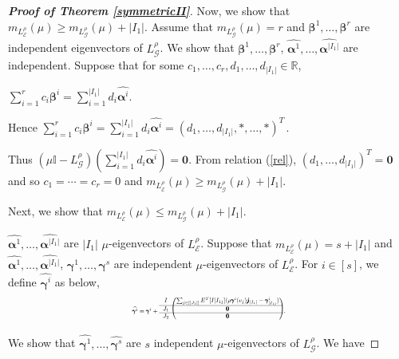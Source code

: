 \documentclass{amsart}
\theoremstyle{remark}
\begin{document}
\begin{proof}[\textbf{Proof of Theorem \ref{symmetricII}}]
Now, we show that $m_{L_{\mathcal{E}}^{\rho}}(\mu)\geq m_{L_{\mathcal{G}}^{\rho}}(\mu)+|I_{1}|$.
Assume that $m_{L_{\mathcal{G}}^{\rho}}(\mu)=r$ and $\pmb{\beta}^{1},\ldots,\pmb{\beta}^{r}$ are independent eigenvectors of $L_{\mathcal{G}}^{\rho}$. We show that $\pmb{\beta}^{1},\ldots,\pmb{\beta}^{r}$, $\widehat{\pmb{\alpha}^{1}},\ldots,\widehat{\pmb{\alpha}^{|I_{1}|}}$ are independent. Suppose that for some $c_{1},\ldots,c_{r},d_{1},\ldots,d_{|I_{1}|}\in\mathbb{R}$,
\begin{center}
$\sum_{i=1}^{r}c_{i}\pmb{\beta}^{i}=\sum_{i=1}^{|I_{1}|}d_{i}\widehat{\pmb{\alpha}^{i}}.$
\end{center}
Hence $\sum_{i=1}^{r}c_{i}\pmb{\beta}^{i}=\sum_{i=1}^{|I_{1}|}d_{i}\widehat{\pmb{\alpha}^{i}}=(d_{1},\ldots,d_{|I_{1}|},\ast,\ldots,\ast)^{T}\,.$

Thus $(\mu\mathbb{I}-L_{\mathcal{G}}^{\rho})(\sum_{i=1}^{|I_{1}|}d_{i}\widehat{\pmb{\alpha}^{i}})=\pmb{0}$. From relation (\ref{rel}),
$(d_{1},\ldots,d_{|I_{1}|})^{T}=\pmb{0}$ and so $c_{1}=\cdots=c_{r}=0$ and $m_{L_{\mathcal{E}}^{\rho}}(\mu)\geq m_{L_{\mathcal{G}}^{\rho}}(\mu)+|I_{1}|$.

Next, we show that $m_{L_{\mathcal{E}}^{\rho}}(\mu)\leq m_{L_{\mathcal{G}}^{\rho}}(\mu)+|I_{1}|$.


 $\widehat{\pmb{\alpha}^{1}},\ldots,\widehat{\pmb{\alpha}^{|I_{1}|}}$ are $|I_{1}|$ $\mu$-eigenvectors of $L_{\mathcal{E}}^{\rho}$. Suppose that $m_{L_{\mathcal{E}}^{\rho}}(\mu)=s+|I_{1}|$ and $\widehat{\pmb{\alpha}^{1}},\ldots,\widehat{\pmb{\alpha}^{|I_{1}|}}$, $\pmb{\gamma}^{1},\ldots,\pmb{\gamma}^{s}$ are independent $\mu$-eigenvectors of $L_{\mathcal{E}}^{\rho}$.
For $i\in [s]$, we define $\widehat{\pmb{\gamma}^{i}}$ as below,
\begin{equation*}
\resizebox{ 0.4\textwidth}{!} 
{$\widehat{\pmb{\gamma}^{i}}=\pmb{\gamma}^{i}+
\begin{blockarray}{cc}
\begin{block}{c(c)}
I&\sum_{j\in [|J_{1}|]} E^{T}[I|I_{1j}](\rho\pmb{\gamma}^{i}(v_{j})\pmb{j}_{|I_{1}|}-\pmb{\gamma}^{i}_{|I_{1j}}) \\\cline{1-2}
J_{1}& \pmb{0}\\\cline{1-2}
J_{2}& \pmb{0}\\
\end{block}
\end{blockarray}\,.$}
\end{equation*}
We show that $\widehat{\pmb{\gamma}^{1}},\ldots,\widehat{\pmb{\gamma}^{s}}$ are $s$ independent $\mu$-eigenvectors of $L_{\mathcal{G}}^{\rho}$. We have


\end{proof}
\end{document}
